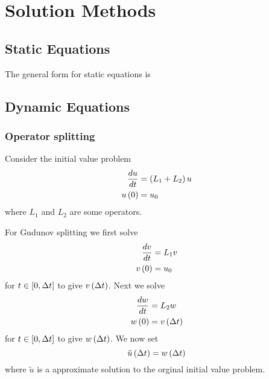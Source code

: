 \section{Solution Methods}
\label{sec:SolutionMethods}

\subsection{Static Equations}
\label{subsec:SolutionMethodsStaticEquations}

The general form for static equations is


\subsection{Dynamic Equations}
\label{subsec:SolutionMethodsDynamicEquations}

\subsubsection{Operator splitting}
\label{subsubsec:DynamicOperatorSplitting}

Consider the initial value problem
\begin{align}
   \dfrac{ d u}{d t} &=\left( L_{1}+L_{2} \right)u \\
   u\left( 0 \right) &=u_{0}
\end{align}
where $L_{1}$ and $L_{2}$ are some operators.

For Gudunov splitting we first solve
\begin{align}
   \dfrac{ d v}{d t} &=L_{1}v \\
   v\left( 0 \right) &=u_{0}
\end{align}
for $t\in\left[ 0,\Delta t \right]$ to give $ v\left( \Delta t \right) $. Next we solve
\begin{align}
   \dfrac{ d w}{d t} &=L_{2}w \\
   w\left( 0 \right) &= v\left( \Delta t \right) 
\end{align}
for $t\in\left[ 0,\Delta t \right]$ to give $ w\left( \Delta t \right) $. We now set
\begin{equation}
 \tilde{u}\left( \Delta t \right) = w\left( \Delta t \right) 
\end{equation}
where $\tilde{u}$ is a approximate solution to the orginal initial value
problem.

